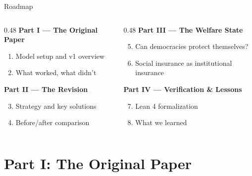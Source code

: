 \documentclass[
  ignorenonframetext,
  aspectratio=169]{beamer}
\begin{document}
\begin{frame}{Roadmap}
\protect{}\label{roadmap}
\begin{columns}[T]
\begin{column}{0.48\textwidth}
\textbf{Part I --- The Original Paper}
\begin{enumerate}
  \item Model setup and v1 overview
  \item What worked, what didn't
\end{enumerate}
\vspace{0.2cm}
\textbf{Part II --- The Revision}
\begin{enumerate}
  \setcounter{enumi}{2}
  \item Strategy and key solutions
  \item Before/after comparison
\end{enumerate}
\end{column}
\begin{column}{0.48\textwidth}
\textbf{Part III --- The Welfare State}
\begin{enumerate}
  \setcounter{enumi}{4}
  \item Can democracies protect themselves?
  \item Social insurance as institutional insurance
\end{enumerate}
\vspace{0.2cm}
\textbf{Part IV --- Verification \& Lessons}
\begin{enumerate}
  \setcounter{enumi}{6}
  \item Lean 4 formalization
  \item What we learned
\end{enumerate}
\end{column}
\end{columns}
\end{frame}

\section{Part I: The Original Paper}\label{part-i-the-original-paper}
\end{document}
